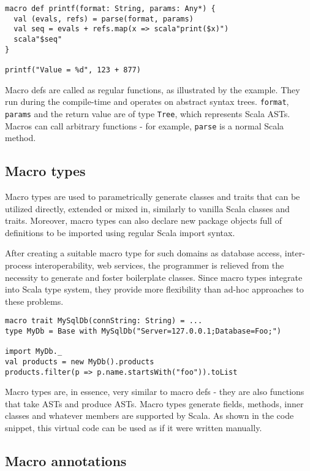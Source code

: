 \documentclass{llncs}
\begin{document}
\noindent
\begin{verbatim}
macro def printf(format: String, params: Any*) {
  val (evals, refs) = parse(format, params)
  val seq = evals + refs.map(x => scala"print($x)")
  scala"$seq"
}

printf("Value = %d", 123 + 877)
\end{verbatim}
\noindent

Macro defs are called as regular functions, as illustrated by the example.
They run during the compile-time and operates on abstract syntax trees.
\texttt{format}, \texttt{params} and the return value are of type \texttt{Tree}, which represents Scala ASTs.
Macros can call arbitrary functions - for example, \texttt{parse} is a normal Scala method.

\subsection{Macro types}

Macro types are used to parametrically generate classes and traits that can be utilized directly, extended or mixed in, similarly to vanilla Scala classes and traits.
Moreover, macro types can also declare new package objects full of definitions to be imported using regular Scala import syntax.

After creating a suitable macro type for such domains as database access, inter-process interoperability, web services,
the programmer is relieved from the necessity to generate and foster boilerplate classes.
Since macro types integrate into Scala type system, they provide more flexibility than ad-hoc approaches to these problems.

\noindent
\begin{verbatim}
macro trait MySqlDb(connString: String) = ...
type MyDb = Base with MySqlDb("Server=127.0.0.1;Database=Foo;")

import MyDb._
val products = new MyDb().products
products.filter(p => p.name.startsWith("foo")).toList
\end{verbatim}
\noindent

Macro types are, in essence, very similar to macro defs - they are also functions that take ASTs and produce ASTs.
Macro types generate fields, methods, inner classes and whatever members are supported by Scala.
As shown in the code snippet, this virtual code can be used as if it were written manually.

\subsection{Macro annotations}
\end{document}
